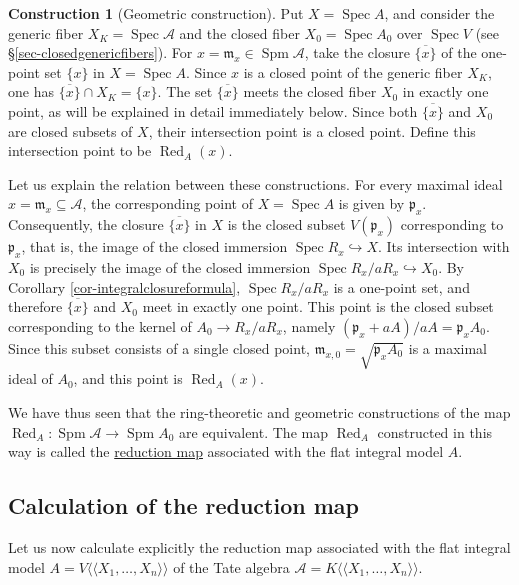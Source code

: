 \documentclass[a4paper,12pt, dvipdfmx]{jsbook}
\def\m{\mathfrak{m}}
\def\ovl#1{\overline{#1}}%
\def\Red{\mathop{\mathrm{Red}}\nolimits}
\def\Spec{\mathop{\mathrm{Spec}}\nolimits}
\def\Spm{\mathop{\mathrm{Spm}}\nolimits}
\def\dl{\langle\!\langle}
\def\dr{\rangle\!\rangle}
\theoremstyle{plain}
\theoremstyle{definition}
\newtheorem{const}[thm]{\bfseries Construction}
\begin{document}
\begin{const}[Geometric construction]\label{const-reductionmapgeometric}{\rm 
Put $X=\Spec A$, and consider the generic fiber $X_K=\Spec\mathcal{A}$ and the closed fiber $X_0=\Spec A_0$ over $\Spec V$ (see \S\ref{sec-closedgenericfibers}).
For $x=\m_x\in\Spm\mathcal{A}$, take the closure $\ovl{\{x\}}$ of the one-point set $\{x\}$ in $X=\Spec A$.
Since $x$ is a closed point of the generic fiber $X_K$, one has $\ovl{\{x\}}\cap X_K=\{x\}$.
The set $\ovl{\{x\}}$ meets the closed fiber $X_0$ in exactly one point, as will be explained in detail immediately below.
Since both $\ovl{\{x\}}$ and $X_0$ are closed subsets of $X$, their intersection point is a closed point.
Define this intersection point to be $\Red_A(x)$.}
\end{const}

Let us explain the relation between these constructions.
For every maximal ideal $x=\m_x\subseteq\mathcal{A}$, the corresponding point of $X=\Spec A$ is given by $\mathfrak{p}_x$.
Consequently, the closure $\ovl{\{x\}}$ in $X$ is the closed subset $V(\mathfrak{p}_x)$ corresponding to $\mathfrak{p}_x$, that is, the image of the closed immersion $\Spec R_x\hookrightarrow X$.
Its intersection with $X_0$ is precisely the image of the closed immersion $\Spec R_x/aR_x\hookrightarrow X_0$. By Corollary \ref{cor-integralclosureformula}, $\Spec R_x/aR_x$ is a one-point set, and therefore $\ovl{\{x\}}$ and $X_0$ meet in exactly one point.
This point is the closed subset corresponding to the kernel of $A_0\rightarrow R_x/aR_x$, namely $(\mathfrak{p}_x+aA)/aA=\mathfrak{p}_xA_0$. Since this subset consists of a single closed point, $\m_{x,0}=\sqrt{\mathfrak{p}_xA_0}$ is a maximal ideal of $A_0$, and this point is $\Red_A(x)$.

We have thus seen that the ring-theoretic and geometric constructions of the map $\Red_A\colon\Spm\mathcal{A}\rightarrow\Spm A_0$ are equivalent.
The map $\Red_A$ constructed in this way is called the \underline{reduction map} associated with the flat integral model $A$.

\subsection{Calculation of the reduction map}\label{sub-reductionmapcalculation}
Let us now calculate explicitly the reduction map associated with the flat integral model $A=V\dl X_1,\ldots,X_n\dr$ of the Tate algebra $\mathcal{A}=K\dl X_1,\ldots,X_n\dr$.
\end{document}
